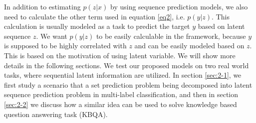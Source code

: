 In addition to estimating $p(z|x)$ by using sequence prediction models, we also need to calculate the other term used in equation \ref{eq2}, i.e. $p(y|z)$. This calculation is usually modeled as a task to predict the target $y$ based on latent sequence $z$. We want $p(y|z)$ to be easily calculable in the framework, because $y$ is supposed to be highly correlated with $z$ and can be easily modeled based on $z$. This is based on the motivation of using latent variable. We will show more details in the following sections. We test our proposed models on two real world tasks, where sequential latent information are utilized. In section \ref{sec:2-1}, we first study a scenario that a set prediction problem being decomposed into latent sequence prediction problem in multi-label classification, and then in section \ref{sec:2-2} we discuss how a similar idea can be used to solve knowledge based question answering task (KBQA).
